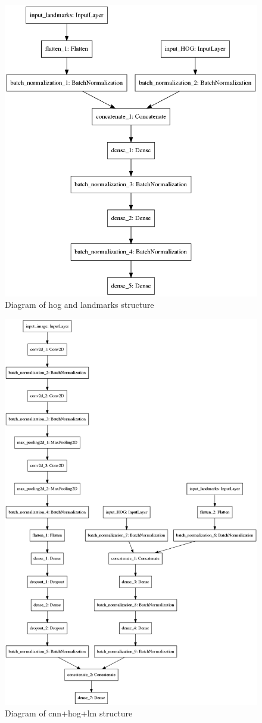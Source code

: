 \begin{figure}
	\centering
	\label{lm+hog}
	\includegraphics[width=.8\textwidth]{images/hog_lm.png}
	\caption{Diagram of hog and landmarks structure}
\end{figure}
\begin{figure}
	\centering
	\label{cnn_lm_hog}
	\includegraphics[width=.8\textwidth]{images/cnn_hog_lm.png}
	\caption{Diagram of cnn+hog+lm structure}
\end{figure}
